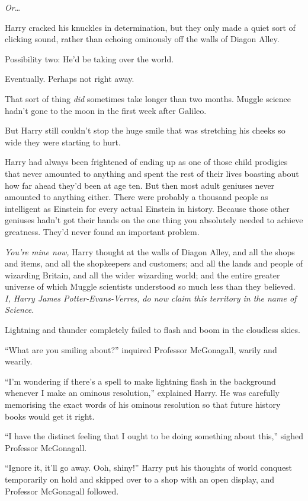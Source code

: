 \emph{Or}…

Harry cracked his knuckles in determination, but they only made a quiet sort of clicking sound, rather than echoing ominously off the walls of Diagon Alley.

Possibility two: He’d be taking over the world.

Eventually. Perhaps not right away.

That sort of thing \emph{did} sometimes take longer than two months. Muggle science hadn’t gone to the moon in the first week after Galileo.

But Harry still couldn’t stop the huge smile that was stretching his cheeks so wide they were starting to hurt.

Harry had always been frightened of ending up as one of those child prodigies that never amounted to anything and spent the rest of their lives boasting about how far ahead they’d been at age ten. But then most adult geniuses never amounted to anything either. There were probably a thousand people as intelligent as Einstein for every actual Einstein in history. Because those other geniuses hadn’t got their hands on the one thing you absolutely needed to achieve greatness. They’d never found an important problem.

\emph{You’re mine now,} Harry thought at the walls of Diagon Alley, and all the shops and items, and all the shopkeepers and customers; and all the lands and people of wizarding Britain, and all the wider wizarding world; and the entire greater universe of which Muggle scientists understood so much less than they believed. \emph{I, Harry James Potter-Evans-Verres, do now claim this territory in the name of Science.}

Lightning and thunder completely failed to flash and boom in the cloudless skies.

“What are you smiling about?” inquired Professor McGonagall, warily and wearily.

“I’m wondering if there’s a spell to make lightning flash in the background whenever I make an ominous resolution,” explained Harry. He was carefully memorising the exact words of his ominous resolution so that future history books would get it right.

“I have the distinct feeling that I ought to be doing something about this,” sighed Professor McGonagall.

“Ignore it, it’ll go away. Ooh, shiny!” Harry put his thoughts of world conquest temporarily on hold and skipped over to a shop with an open display, and Professor McGonagall followed.

